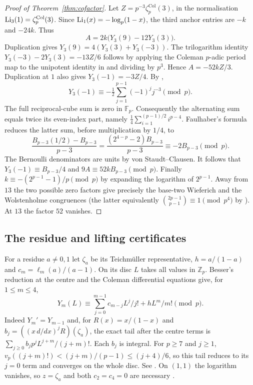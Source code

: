 \begin{proof}[Proof of Theorem~\ref{thm:cofactor}]
Let $Z=p^{-3}\zeta_p^{\mathrm{Col}}(3)$, in the normalisation
$\operatorname{Li}_3(1)=\zeta_p^{\mathrm{Col}}(3)$.
Since $\operatorname{Li}_1(x)=-\log_p(1-x)$, the third anchor
entries are $-k$ and $-24k$. Thus
\[
 A=2k\bigl(Y_3(9)-12Y_3(3)\bigr).
\]
Duplication gives $Y_3(9)=4(Y_3(3)+Y_3(-3))$.
The trilogarithm identity
$Y_3(-3)-2Y_3(3)=-13Z/6$ follows by applying the Coleman
$p$-adic period map to the unipotent identity in
\cite[\S5.7, (5.21)]{CDL} and dividing by $p^3$. Hence $A=-52kZ/3$.
Duplication at $1$ also gives $Y_3(-1)=-3Z/4$.
By \cite[Proposition~2.1]{Besser},
\[
 Y_3(-1)\equiv-\tfrac12\sum_{j=1}^{p-1}(-1)^j j^{-3}
 \pmod p.
\]
The full reciprocal-cube sum is zero in $\mathbb F_p$. Consequently
the alternating sum equals twice its even-index part, namely
$\tfrac14\sum_{i=1}^{(p-1)/2}i^{p-4}$. Faulhaber's formula reduces
the latter sum, before multiplication by $1/4$, to
\[
 \frac{B_{p-3}(1/2)-B_{p-3}}{p-3}
 =\frac{(2^{4-p}-2)B_{p-3}}{p-3}
 \equiv-2B_{p-3}\pmod p .
\]
The Bernoulli denominators are units by von Staudt--Clausen.
It follows that $Y_3(-1)\equiv B_{p-3}/4$ and
$9A\equiv52kB_{p-3}\pmod p$.
Finally $k\equiv-(2^{p-1}-1)/p\pmod p$ by expanding the logarithm
of $2^{p-1}$. Away from $13$ the two possible zero factors give
precisely the base-two Wieferich and the Wolstenholme congruences
(the latter equivalently $\binom{2p-1}{p-1}\equiv1\pmod{p^4}$ by
\cite[Theorem~1]{AebiCairns}). At $13$ the factor $52$ vanishes.
\end{proof}

\subsection{The residue and lifting certificates}

For a residue $a\ne0,1$ let $\zeta_a$ be its Teichm\"uller representative,
$h=a/(1-a)$ and $c_m=\ell_m(a)/(a-1)$. On its disc $L$ takes all
values in $\mathbb Z_p$. Besser's reduction at the centre and the
Coleman differential equations give, for $1\le m\le4$,
\begin{equation}\label{eq:exc-local}
 Y_m(L)\equiv\sum_{j=0}^{m-1}c_{m-j}L^j/j!+hL^m/m!\pmod p.
\end{equation}
Indeed $Y_m'=Y_{m-1}$ and, for $R(x)=x/(1-x)$ and
$b_j=((x\,d/dx)^jR)(\zeta_a)$, the exact tail after the centre
terms is $\sum_{j\ge0}b_jp^jL^{j+m}/(j+m)!$. Each $b_j$ is integral.
For $p\ge7$ and $j\ge1$, $v_p((j+m)!)< (j+m)/(p-1)\le(j+4)/6$,
so this tail reduces to its $j=0$ term and converges on the whole
disc. See \cite[Propositions~2.1 and~2.3]{Besser}.
On $(1,1)$ the logarithm vanishes, so $z=\zeta_a$ and both
$c_2=c_4=0$ are necessary \cite[Theorem~3.2]{Ludtke}.

